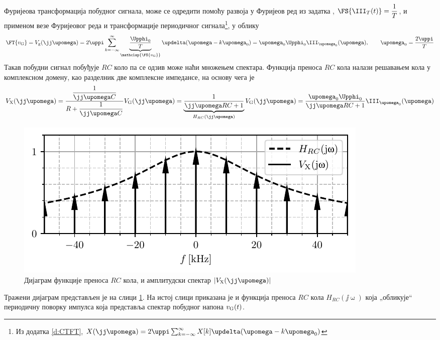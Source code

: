 Фуријеова трансформација побудног сигнала, може се одредити помоћу развоја у Фуријеов ред из
задатка , $\FS{\III_T(t)} = \dfrac{1}{T}$, и применом везе Фуријеовог  
реда и трансформације периодичног сигнала\footnote{Из додатка
\ref{d:CTFT}, 
$
X(\jj\upomega) = 2\uppi \sum_{k = -\infty}^{\infty} X[k] \updelta( \upomega - k \upomega_{\rm 0} )
$
}, у облику 
\begin{equation}
    \FT{v_{\rm G}} = V_{\rm g}(\jj\upomega) = 2\uppi  \sum_{k = -\infty}^{\infty} \underbrace{\dfrac{\Upphi_0}{T}}_{\mathclap{\FS{v_{\rm G}}}} \updelta( \upomega - k \upomega_{\rm 0} )
    = {\upomega_0 \Upphi_0}\III_{\upomega_0}(\upomega), \qquad \upomega_0 = \dfrac{2\uppi}{T}
\end{equation}
Такав побудни сигнал побуђује $RC$ коло па се одзив може наћи множењем спектара. 
Функција преноса $RC$ кола налази решавањем кола у комплексном домену, 
као разделник две комплексне импедансе, на основу чега је  
\begin{eqnarray}
    V_{\rm X}(\jj\upomega) = \dfrac{ \dfrac{1}{\jj\upomega C} }{ R + \dfrac{1}{\jj\upomega C} } V_{\rm G}(\jj\upomega)
                           = \underbrace{\dfrac{ 1 }{ \jj\upomega RC + 1 }}_{H_{RC}(\jj\upomega)} V_{\rm G}(\jj\upomega)
                           = \dfrac{ {\upomega_0 \Upphi_0} }{ \jj\upomega RC + 1 } \III_{\upomega_0}(\upomega)
\end{eqnarray}
%
\begin{figure}
    \centering
    \includegraphics{fig/comb_snaga_result.pdf}
    \caption{Дијаграм функције преноса $RC$ кола, и амплитудски спектар $|V_{\rm X}(\jj\upomega)|$ }
    \label{fig:\ID.vx}
\end{figure}
%
Тражени дијаграм представљен је на слици \ref{fig:\ID.vx}. На истој слици приказана је и функција преноса $RC$ кола
$H_{RC}(\jj\upomega)$ која „обликује“ периодичну поворку импулса која представља спектар побудног напона $v_{\rm G}(t)$.

